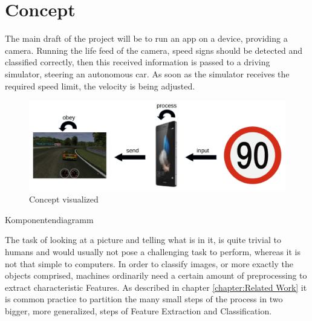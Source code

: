 \chapter{Concept}\label{chapter:Concept}
The main draft of the project will be to run an app on a device, providing a camera. Running the life feed of the camera, speed signs should be detected and classified correctly, then this received information is passed to a driving simulator, steering an autonomous car. As soon as the simulator receives the required speed limit, the velocity is being adjusted. 
\begin{figure}[H]
	\includegraphics[width=\linewidth]{images/concept.jpg}
	\caption{Concept visualized}
\end{figure}

Komponentendiagramm\newline

The task of looking at a picture and telling what is in it, is quite trivial to humans and would usually not pose a challenging task to perform, whereas it is not that simple to computers. In order to classify images, or more exactly the objects comprised, machines ordinarily need a certain amount of preprocessing to extract characteristic Features. As described in chapter \ref{chapter:Related Work} it is common practice to partition the many small steps of the process in two bigger, more generalized, steps of Feature Extraction and Classification.



